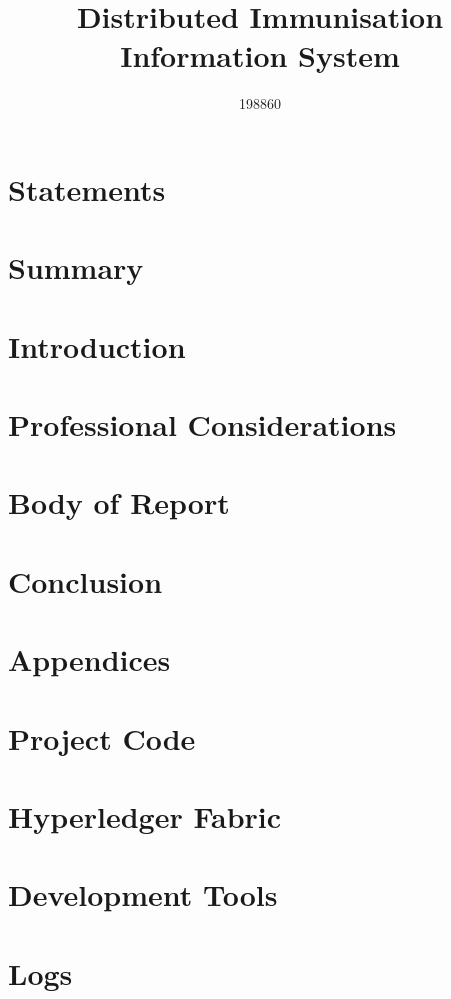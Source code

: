 \documentclass{report}
\title{Distributed Immunisation Information System}
\author{198860}
\begin{document}


\begin{flushleft}

\chapter{Statements}


\chapter{Summary}


\tableofcontents

\listoffigures

\chapter{Introduction}


\chapter{Professional Considerations}


\chapter{Body of Report}


\chapter{Conclusion}


\printbibliography

\chapter{Appendices}
\appendix
\chapter{Project Code}

\chapter{Hyperledger Fabric}

\chapter{Development Tools}

\chapter{Logs}


\end{flushleft}
\end{document}
